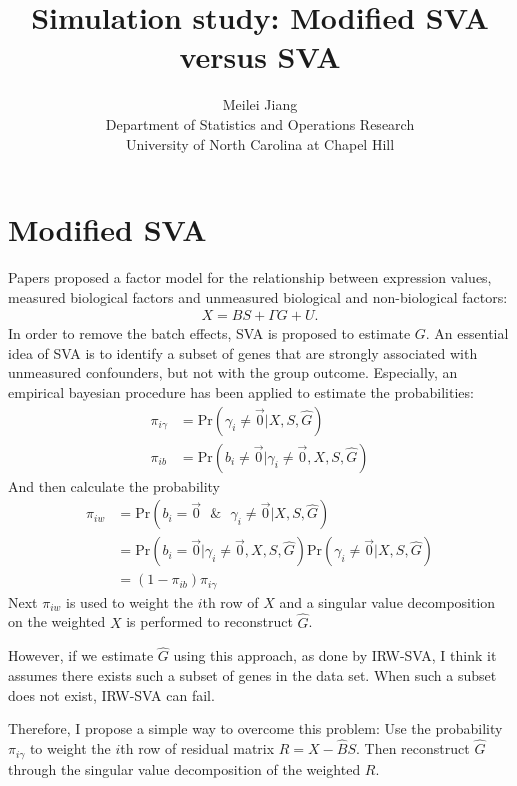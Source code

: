 \documentclass[11pt]{article}
\begin{document}
\author{Meilei Jiang\\
    Department of Statistics and Operations Research\\
		University of North Carolina at Chapel Hill}
\title{Simulation study: Modified SVA versus SVA}

\maketitle
\section{Modified SVA}
Papers \cite{leek2012sva, leek2007capturing, leek2008general} proposed a factor model for the relationship between expression values, measured biological factors and unmeasured biological and non-biological factors:
$$ \begin{aligned}
X = B S + \Gamma G + U.
\end{aligned}$$
In order to remove the batch effects, SVA is proposed to estimate $G$. An essential idea of SVA is to identify a subset of genes that are strongly associated with unmeasured confounders, but not with the group outcome. Especially, an empirical bayesian procedure has been applied to estimate the probabilities: 
$$\begin{aligned}
\pi_{i\gamma} &= \text{Pr}( \gamma_i \neq \vec{0}| X, S, \hat{G}) \\
\pi_{i b} &= \text{Pr}(b_i \neq \vec{0} | \gamma_i \neq \vec{0}, X, S, \hat{G}) 
\end{aligned}$$
And then calculate the probability
$$\begin{aligned}
\pi_{i w} &= \text{Pr}(b_i = \vec{0} \text{ } \& \text{ } \gamma_i \neq \vec{0} | X, S, \hat{G}) \\
&= \text{Pr}(b_i = \vec{0} | \gamma_i \neq \vec{0}, X, S, \hat{G}) \text{Pr}( \gamma_i \neq \vec{0}| X, S, \hat{G}) \\
&= (1 - \pi_{i b})\pi_{i\gamma}                     
\end{aligned}$$
Next $\pi_{i w}$ is used to weight the $i$th row of $X$ and a singular value decomposition on the weighted $X$ is performed to reconstruct $\hat{G}$.

However, if we estimate $\hat{G}$ using this approach, as done by IRW-SVA, I think it assumes there exists such a subset of genes in the data set. When such a subset does not exist, IRW-SVA can fail. 

Therefore, I propose a simple way to overcome this problem: Use the probability $\pi_{i \gamma}$ to weight the $i$th row of residual matrix $R = X - \hat{B} S$. Then reconstruct $\hat{G}$ through the singular value decomposition of the weighted $R$. 
\end{document}
